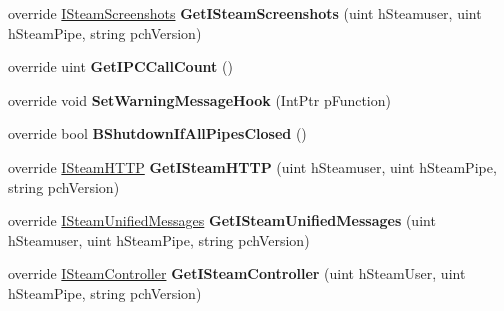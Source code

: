 \begin{DoxyCompactItemize}
override \hyperlink{class_valve_1_1_steamworks_1_1_i_steam_screenshots}{I\+Steam\+Screenshots} {\bfseries Get\+I\+Steam\+Screenshots} (uint h\+Steamuser, uint h\+Steam\+Pipe, string pch\+Version)
\item 
\mbox{\label{class_valve_1_1_steamworks_1_1_c_steam_client_ab870ca0db394338e55e0e736795bec24}} 
override uint {\bfseries Get\+I\+P\+C\+Call\+Count} ()
\item 
\mbox{\label{class_valve_1_1_steamworks_1_1_c_steam_client_a621014698e2078730aad8f614e09fca5}} 
override void {\bfseries Set\+Warning\+Message\+Hook} (Int\+Ptr p\+Function)
\item 
\mbox{\label{class_valve_1_1_steamworks_1_1_c_steam_client_ac90fae1289516176f60e4e086321854a}} 
override bool {\bfseries B\+Shutdown\+If\+All\+Pipes\+Closed} ()
\item 
\mbox{\label{class_valve_1_1_steamworks_1_1_c_steam_client_a9f375a61d5f800ec69ada95882362926}} 
override \hyperlink{class_valve_1_1_steamworks_1_1_i_steam_h_t_t_p}{I\+Steam\+H\+T\+TP} {\bfseries Get\+I\+Steam\+H\+T\+TP} (uint h\+Steamuser, uint h\+Steam\+Pipe, string pch\+Version)
\item 
\mbox{\label{class_valve_1_1_steamworks_1_1_c_steam_client_aaf57b8f082d90ba5c961544462c360ad}} 
override \hyperlink{class_valve_1_1_steamworks_1_1_i_steam_unified_messages}{I\+Steam\+Unified\+Messages} {\bfseries Get\+I\+Steam\+Unified\+Messages} (uint h\+Steamuser, uint h\+Steam\+Pipe, string pch\+Version)
\item 
\mbox{\label{class_valve_1_1_steamworks_1_1_c_steam_client_a45c06dec75c161d6f09a5a206787a9f7}} 
override \hyperlink{class_valve_1_1_steamworks_1_1_i_steam_controller}{I\+Steam\+Controller} {\bfseries Get\+I\+Steam\+Controller} (uint h\+Steam\+User, uint h\+Steam\+Pipe, string pch\+Version)
\item 
\mbox{\label{class_valve_1_1_steamworks_1_1_c_steam_client_a4ea3f0ce63c8c375d919caafeeb63c77}} 

\end{DoxyCompactItemize}
